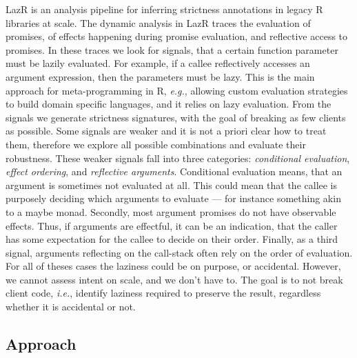 \documentclass[review,nonacm,screen,acmsmall,anonymous=true]{acmart}
\newcommand{\lazr}{{\sf LazR}\xspace}
\newcommand{\eg}{\emph{e.g.},\xspace}
\newcommand{\ie}{\emph{i.e.},\xspace}
\begin{document}
\lazr is an analysis pipeline for inferring strictness annotations in legacy R
libraries at scale. The dynamic analysis in \lazr traces
the evaluation of promises, of effects happening during promise evaluation, and
reflective access to promises. In these traces we look for signals, that a
certain function parameter must be lazily evaluated. For example, if a
callee reflectively accesses an argument expression, then the parameters
must be lazy. This is the main approach for meta-programming in R, \eg
allowing custom evaluation strategies to build domain specific languages, and it
relies on lazy evaluation. From the signals we generate strictness signatures,
with the goal of breaking as few clients as possible.
Some signals are weaker
and it is not a priori clear how to treat them, therefore we explore all
possible combinations and evaluate their robustness. These weaker signals fall
into three categories: \emph{conditional evaluation}, \emph{effect ordering},
and \emph{reflective arguments}. Conditional evaluation means, that an argument is
sometimes not evaluated at all. This could mean that the
callee is purposely deciding which arguments to evaluate --- for instance
something akin to a maybe monad. Secondly, most argument promises do not have
observable effects. Thus, if arguments are effectful, it can be
an indication, that the caller has some expectation for the callee to decide on
their order. Finally, as a third signal, arguments reflecting on the call-stack
often rely on the order of evaluation. For all of theses cases the laziness
could be on purpose, or accidental. However, we cannot assess intent on scale, and we don't have to. The
goal is to not break client code, \ie identify laziness required to preserve
the result, regardless whether it is accidental or not.

\subsection{Approach}
\end{document}
